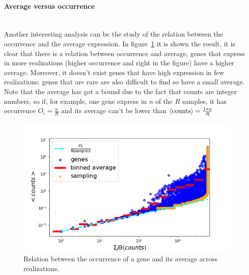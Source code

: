 \paragraph{Average versus occurrence}\mbox{}\\
Another interesting analysis can be the study of the relation between the occurrence and the average expression. In figure~\ref{fig:scalinglaws/gtex/meanDiff_binned_sampling} it is shown the result, it is clear that there is a relation between occurrence and average, genes that express in more realizations (higher occurrence and right in the figure) have a higher average. Moreover, it doesn't exist genes that have high expression in few realizations; genes that are rare are also difficult to find so have a small average. Note that the average has got a bound due to the fact that counts are integer numbers, so if, for example, one gene express in $n$ of the $R$ samples, it has occurrence $O_i=\frac{n}{R}$ and its average can't be lower than $\left\langle \mathrm{counts}\right\rangle=\frac{1*n}{R}$
\begin{figure}[htb!]
    \centering
    \includegraphics[width=0.9\linewidth]{pictures/scalinglaws/gtex/meanDiff_binned_sampling.png}
    \caption{Relation between the occurrence of a gene and its average across realizations.}
    \label{fig:scalinglaws/gtex/meanDiff_binned_sampling}
\end{figure}
